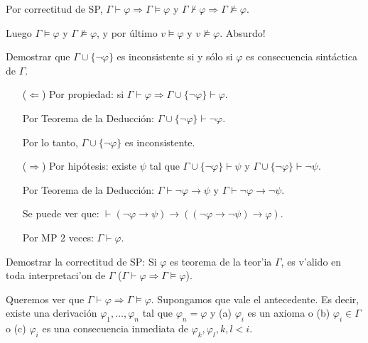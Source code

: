 \begin{questions}
\begin{solution}
Por correctitud de SP, $\Gamma\vdash\varphi \Rightarrow \Gamma\vDash\varphi$ y $\Gamma\nvdash\varphi\Rightarrow \Gamma\nvDash\varphi$. 

Luego $\Gamma\vDash\varphi$ y $\Gamma\nvDash\varphi$, y por \'ultimo $v \vDash \varphi$ y $v \nvDash \varphi$. Absurdo!

\end{solution}

\question Demostrar que $\Gamma \cup \{\neg\varphi\}$ es inconsistente si y s\'olo si $\varphi$ es consecuencia sint\'actica de $\Gamma$.

\begin{solution}
 
 \begin{itemize}
  \item[($\Leftarrow$)] Por propiedad: si $\Gamma\vdash\varphi \Rightarrow \Gamma\cup\{\neg\varphi\}\vdash\varphi$.
  
    Por Teorema de la Deducci\'on: $\Gamma\cup\{\neg\varphi\}\vdash\neg\varphi$.
    
    Por lo tanto, $\Gamma\cup\{\neg\varphi\}$ es inconsistente.
  \item[($\Rightarrow$)] Por hip\'otesis: existe $\psi$ tal que $\Gamma\cup\{\neg\varphi\}\vdash\psi$ y $\Gamma\cup\{\neg\varphi\}\vdash\neg\psi$. 
  
  Por Teorema de la Deducci\'on: $\Gamma\vdash\neg\varphi\rightarrow\psi$ y $\Gamma\vdash\neg\varphi\rightarrow\neg\psi$. 
  
  Se puede ver que: $\vdash(\neg\varphi\rightarrow\psi)\rightarrow((\neg\varphi\rightarrow\neg\psi)\rightarrow\varphi)$. 
  
  Por MP 2 veces: $\Gamma\vdash\varphi$.
 \end{itemize}

\end{solution}

\question Demostrar la correctitud de SP: Si $\varphi$ es teorema de la teor'ia $\Gamma$, es v'alido en toda interpretaci'on de $\Gamma$ ($\Gamma \vdash \varphi \Rightarrow \Gamma \vDash \varphi$). 

\begin{solution}

 Queremos ver que $\Gamma\vdash\varphi \Rightarrow \Gamma\vDash\varphi$. Supongamos que vale el antecedente. Es decir, existe una derivaci\'on $\varphi_1, \dots, \varphi_n$ tal que $\varphi_n=\varphi$ y (a) $\varphi_i$ es un axioma o (b) $\varphi_i\in\Gamma$ o (c) $\varphi_i$ es una consecuencia inmediata de $\varphi_k,\varphi_l, k,l<i$.
 

\end{solution}
\end{questions}
